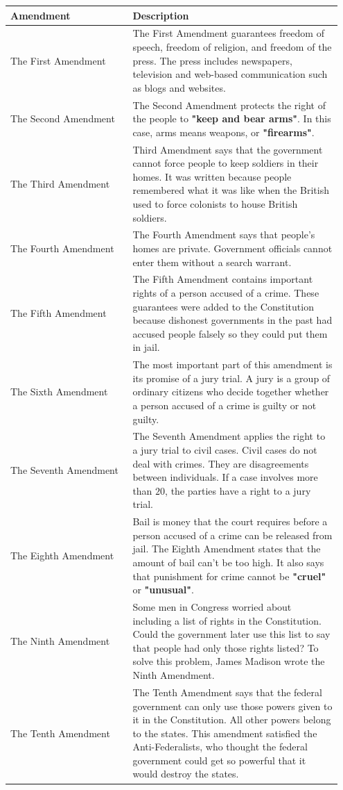 \begin{center}
	\begin{table}[htbp]
		\begin{tabular}{ p{0.35\linewidth} | p{0.6\linewidth} } 
			\hline
			Amendment & Description \\
			\hline
			The First Amendment & The First Amendment guarantees freedom of speech,
			freedom of religion, and freedom of the press. The press includes
			newspapers, television and web-based communication such as blogs and
			websites. \\ \hline
			The Second Amendment & The Second Amendment protects the right of the
			people to \textbf{"keep and bear arms"}. In this case, arms means
			weapons, or \textbf{"firearms"}. \\ \hline
			The Third Amendment &  Third Amendment says that the government cannot
			force people to keep soldiers in their homes. It was written because
			people remembered what it was like when the British used to force
			colonists to house British soldiers. \\ \hline
			The Fourth Amendment & The Fourth Amendment says that people's homes are
			private. Government officials cannot enter them without a search warrant.
			\\ \hline
			The Fifth Amendment & The Fifth Amendment contains important rights of a
			person accused of a crime. These guarantees were added to the
			Constitution because dishonest governments in the past had accused people
			falsely so they could put them in jail. \\ \hline
			The Sixth Amendment & The most important part of this amendment is its
			promise of a jury trial. A jury is a group of ordinary citizens who
			decide together whether a person accused of a crime is guilty or not
			guilty. \\ \hline
			The Seventh Amendment & The Seventh Amendment applies the right to a jury
			trial to civil cases. Civil cases do not deal with crimes. They are
			disagreements between individuals. If a case involves more than $20$, the
			parties have a right to a jury trial. \\ \hline
			The Eighth Amendment & Bail is money that the court requires before a
			person accused of a crime can be released from jail. The Eighth Amendment
			states that the amount of bail can't be too high. It also says that
			punishment for crime cannot be \textbf{"cruel"} or \textbf{"unusual"}. \\
			\hline
			The Ninth Amendment & Some men in Congress worried about including a list
			of rights in the Constitution. Could the government later use this list
			to say that people had only those rights listed? To solve this problem,
			James Madison wrote the Ninth Amendment. \\ \hline
			The Tenth Amendment & The Tenth Amendment says that the federal
			government can only use those powers given to it in the Constitution. All
			other powers belong to the states. This amendment satisfied the
			Anti-Federalists, who thought the federal government could get so
			powerful that it would destroy the states. \\ \hline
		\end{tabular}
		

\end{table}
\end{center}
